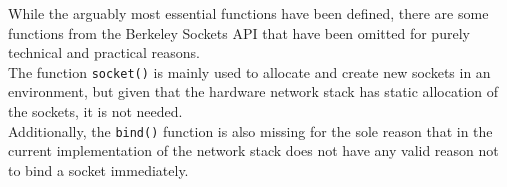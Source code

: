 While the arguably most essential functions have been defined, there are some
functions from the Berkeley Sockets API that have been omitted for purely
technical and practical reasons.\\
The function \texttt{socket()} is mainly used to allocate and create new sockets
in an environment, but given that the hardware network stack has static allocation
of the sockets, it is not needed.\\
Additionally, the \texttt{bind()} function is also missing for the sole reason
that in the current implementation of the network stack does not have any valid
reason not to bind a socket immediately.



